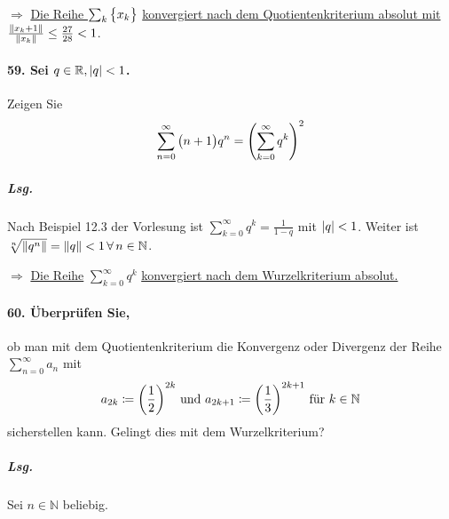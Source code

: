 \documentclass{scrreprt}
\begin{document}
\begin{enumerate}[(a)]
  $\Rightarrow$ \underline{Die Reihe } $\sum_k \qty\big{x_k}$
  \underline{ konvergiert nach dem Quotientenkriterium absolut mit }
  $\frac{\norm{x_k + 1}}{\norm{x_k}} \leq \frac{27}{28} < 1$.
\end{enumerate}

\newpage
\paragraph{59. Sei $q \in \mathbb{R}, \abs{q} < 1$.}
Zeigen Sie
\[
  \sum_{n = 0}^{\infty} \qty\big(n + 1)q^n = \qty(\sum_{k = 0}^{\infty} q^k)^2
\]

\subparagraph{Lsg.} Nach Beispiel 12.3 der Vorlesung ist
$\displaystyle \sum_{k = 0}^{\infty} q^k = \frac{1}{1 - q}$ mit
$\abs{q} < 1$.
Weiter ist $\sqrt[n]{\norm{q^n}} = \norm{q} < 1 \, \forall \, n \in \mathbb{N}$.

$\Rightarrow$ \underline{Die Reihe} $\displaystyle \sum_{k = 0}^{\infty} q^k$
\underline{konvergiert nach dem Wurzelkriterium absolut.}


\paragraph{60. Überprüfen Sie,} ob man mit dem Quotientenkriterium die
Konvergenz oder Divergenz der Reihe $\displaystyle \sum_{n = 0}^{\infty} a_n$
mit
\[
  a_{2k} \coloneqq \qty(\frac{1}{2})^{2k}
  \text{ und }
  a_{2k + 1} \coloneqq \qty(\frac{1}{3})^{2k + 1}
  \text{ für } k \in \mathbb{N}
\]
sicherstellen kann.
Gelingt dies mit dem Wurzelkriterium?

\subparagraph{Lsg.} Sei $n \in \mathbb{N}$ beliebig.
\end{document}
